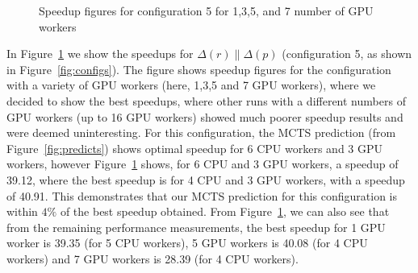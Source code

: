 \documentclass[smallextended]{svjour3}
\begin{document}
\begin{figure}[t]
\begin{center}
\caption{Speedup figures for configuration 5 for 1,3,5, and 7 number of GPU workers} 
\label{ver2}
\end{center}
\end{figure}
In Figure~\ref{ver2} we show the speedups for $\Delta(r) \parallel \Delta(p)$ (configuration 5, as shown in Figure~\ref{fig:configs}).
The figure shows speedup figures for the configuration with a variety of GPU workers (here, 1,3,5 and 7 GPU workers), where
we decided to show the best speedups, where other runs with a different numbers of GPU workers (up to 16 GPU workers) showed much poorer speedup results and 
were deemed uninteresting.
For this configuration, the MCTS prediction (from Figure~\ref{fig:predicts}) shows optimal speedup for 6 CPU workers and 3 GPU workers, 
however Figure~\ref{ver2} shows, for 6 CPU and 3 GPU workers, a speedup of 39.12, where the best speedup is for 4 CPU and 3 GPU workers, with a speedup of 40.91.
This demonstrates that our MCTS prediction for this configuration is within $4\%$ of the best speedup obtained.
From Figure~\ref{ver2}, we can also see that from the remaining performance measurements, the best speedup for 1 GPU worker is 39.35 (for 5 CPU workers), 5 GPU workers is 40.08 (for 4 CPU workers) and 7 GPU workers is 28.39 (for 4 CPU workers).
\end{document}
